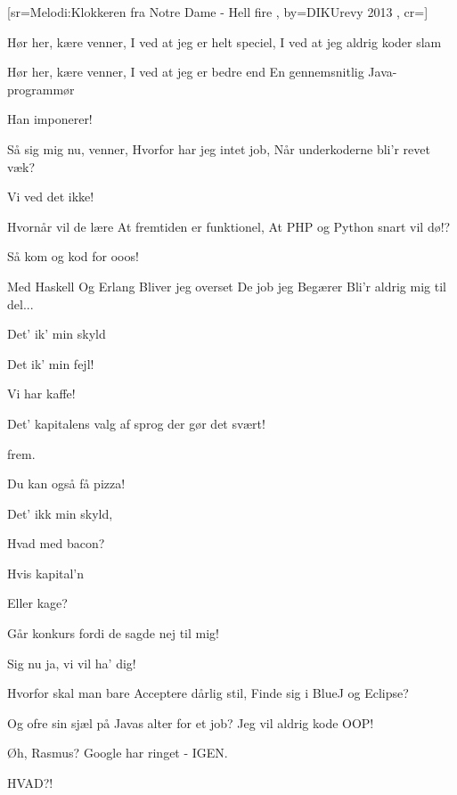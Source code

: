 \documentclass[pdftex,12pt]{article}
\begin{document}
\begin{songs}{}
[sr={Melodi:Klokkeren fra Notre Dame - Hell fire}
,
by={DIKUrevy 2013}
,
cr={}]\hypertarget{Jobsøgning}{}
\label{song20}

\beginverse
Hør her, kære venner,
I ved at jeg er helt speciel,
I ved at jeg aldrig koder slam

\endverse
\beginverse
Hør her, kære venner,
I ved at jeg er bedre end
En gennemsnitlig Java-programmør

\endverse
\beginverse
Han imponerer!

\endverse
\beginverse
Så sig mig nu, venner,
Hvorfor har jeg intet job,
Når underkoderne bli'r revet væk?

\endverse
\beginverse
Vi ved det ikke!

\endverse
\beginverse
Hvornår vil de lære
At fremtiden er funktionel,
At PHP og Python snart vil dø!?

\endverse
\beginverse
Så kom og kod for ooos!

\endverse
\beginverse
Med Haskell
Og Erlang
Bliver jeg overset
De job jeg
Begærer
Bli'r aldrig mig til del...

\endverse
\beginverse
Det' ik' min skyld

\endverse
\beginverse
Det ik' min fejl!

\endverse
\beginverse
Vi har kaffe!

\endverse
\beginverse
Det' kapitalens valg af sprog
der gør det svært!

\endverse
\beginverse
  frem.

\endverse
\beginverse
Du kan også få pizza!

\endverse
\beginverse
Det' ikk min skyld,

\endverse
\beginverse
Hvad med bacon?

\endverse
\beginverse
Hvis kapital'n

\endverse
\beginverse
Eller kage?

\endverse
\beginverse
Går konkurs fordi de sagde nej til mig!

\endverse
\beginverse
Sig nu ja, vi vil ha' dig!

\endverse
\beginverse
Hvorfor skal man bare
Acceptere dårlig stil,
Finde sig i BlueJ og Eclipse?

\endverse
\beginverse
Og ofre sin sjæl på
Javas alter for et job?
Jeg vil aldrig kode OOP!

\endverse
\beginverse
Øh, Rasmus? Google har ringet - IGEN.

\endverse
\beginverse
HVAD?!


\end{songs}
\end{document}
